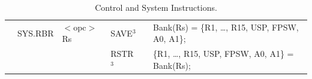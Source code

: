 \begin{table}
\begin{subtable}{\linewidth}
\begin{center}
\begin{tabular}{llllll}
                   & SYS.RBR           & $<$opc$>$ Rs                          & SAVE$^{3}$        & \flags{----}      & Bank(Rs) = \{R1, \ldots, R15, USP, FPSW, A0, A1\};                            \\
                   &                   &                                       & RSTR$^{3}$        & \flags{----}      & \{R1, \ldots, R15, USP, FPSW, A0, A1\} = Bank(Rs);                            \\ \hline
\end{tabular}
\end{center}
\captionsetup{font=scriptsize, labelfont=scriptsize}
\caption{System Instructions. RTE, RTFI, MVTIPL, WAIT, SAVE and RSTR are privileged. 
Bank(n) is register save bank n. LI is cleared only from v2. In MVTC, flags are updated
only when Cr is PSW.}
\end{subtable}

\captionsetup{font=scriptsize, labelfont=scriptsize}
\caption{Control and System Instructions.}
\end{table}



